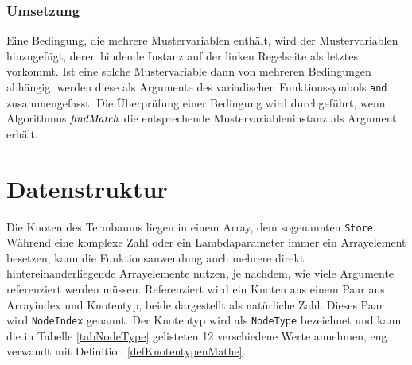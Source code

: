 \subsubsection{Umsetzung}
Eine Bedingung, die mehrere Mustervariablen enthält, wird der Mustervariablen hinzugefügt, deren bindende Instanz auf der linken Regelseite als letztes vorkommt. Ist eine solche Mustervariable dann von mehreren Bedingungen abhängig, werden diese als Argumente des variadischen Funktionssymbols \verb|and| zusammengefasst. Die Überprüfung einer Bedingung wird durchgeführt, wenn Algorithmus $\mathit{findMatch}$ die entsprechende Mustervariableninstanz als Argument erhält. 





\section{Datenstruktur}
Die Knoten des Termbaums liegen in einem Array, dem sogenannten \verb|Store|. Während eine komplexe Zahl oder ein Lambdaparameter immer ein Arrayelement besetzen, kann die Funktionsanwendung auch mehrere direkt hintereinanderliegende Arrayelemente nutzen, je nachdem, wie viele Argumente referenziert werden müssen. Referenziert wird ein Knoten aus einem Paar aus Arrayindex und Knotentyp, beide dargestellt als natürliche Zahl. Dieses Paar wird \verb|NodeIndex| genannt. Der Knotentyp wird als \verb|NodeType| bezeichnet und kann die in Tabelle \ref{tabNodeType} gelisteten 12 verschiedene Werte annehmen, eng verwandt mit Definition \ref{defKnotentypenMathe}.

